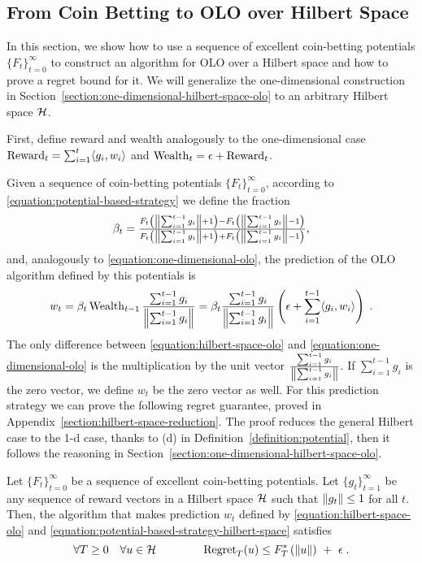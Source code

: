 \subsection{From Coin Betting to OLO over Hilbert Space}
\label{section:reduction_hilbert}

In this section, we show how to use a sequence of excellent coin-betting
potentials $\{F_t\}_{t=0}^\infty$ to construct an algorithm for \ac{OLO} over a
Hilbert space and how to prove a regret bound for it.  We will generalize the
one-dimensional construction in
Section~\ref{section:one-dimensional-hilbert-space-olo} to an arbitrary Hilbert
space $\mathcal{H}$.

First, define reward and wealth analogously to the one-dimensional case
$\operatorname{Reward}_t = \sum_{i=1}^t \langle g_i, w_i \rangle$ and $\operatorname{Wealth}_t = \epsilon +
\operatorname{Reward}_t$.

Given a sequence of coin-betting potentials $\{F_t\}_{t=0}^\infty$, according
to \eqref{equation:potential-based-strategy} we define the fraction
\begin{equation}
\label{equation:potential-based-strategy-hilbert-space}
\beta_t = \tfrac{F_t \left(\left\|{\sum_{i=1}^{t-1} g_i}\right\| + 1\right) - F_t\left(\left\|{\sum_{i=1}^{t-1} g_i}\right\| - 1 \right)}{F_t\left(\left\|{\sum_{i=1}^{t-1} g_i}\right\| + 1 \right) + F_t\left(\left\|{\sum_{i=1}^{t-1} g_i}\right\| - 1 \right)},
\end{equation}
and, analogously to \eqref{equation:one-dimensional-olo}, the prediction of the OLO algorithm
defined by this potentials is
\begin{equation}
\label{equation:hilbert-space-olo}
w_t = \beta_t \operatorname{Wealth}_{t-1} \frac{\sum_{i=1}^{t-1} g_i}{\left\|{\sum_{i=1}^{t-1} g_i}\right\|}
= \beta_t \frac{\sum_{i=1}^{t-1} g_i}{\left\|{\sum_{i=1}^{t-1} g_i}\right\|} \left(\epsilon+ \sum_{i=1}^{t-1} \langle g_i, w_i\rangle \right) \; .
\end{equation}
The only difference between \eqref{equation:hilbert-space-olo} and
\eqref{equation:one-dimensional-olo} is the multiplication by the unit vector
$\frac{\sum_{i=1}^{t-1} g_i}{\left\|{\sum_{i=1}^{t-1} g_i}\right\|}$. If $\sum_{i=1}^{t-1}
g_i$ is the zero vector, we define $w_t$ be the zero vector as well.  For this
prediction strategy we can prove the following regret guarantee, proved in
Appendix~\ref{section:hilbert-space-reduction}.  The proof reduces the general
Hilbert case to the 1-d case, thanks to (d) in
Definition~\ref{definition:potential}, then it follows the  reasoning in
Section~\ref{section:one-dimensional-hilbert-space-olo}.
%
\begin{theorem}
\label{theorem:hilbert-space-olo-regret-bound}
Let $\{F_t\}_{t=0}^\infty$ be a sequence of excellent coin-betting potentials.
Let $\{g_t\}_{t=1}^\infty$ be any sequence of reward vectors in a Hilbert space
$\mathcal{H}$ such that $\left\|{g_t}\right\| \le 1$ for all $t$. Then, the algorithm that makes
prediction $w_t$ defined by \eqref{equation:hilbert-space-olo} and
\eqref{equation:potential-based-strategy-hilbert-space} satisfies
\[
\forall T \ge 0 \quad
\forall u \in \mathcal{H} \qquad \qquad
\operatorname{Regret}_T(u) \le F_T^*\left(\left\|{u}\right\| \right) \ + \ \epsilon \; .
\]
\end{theorem}

